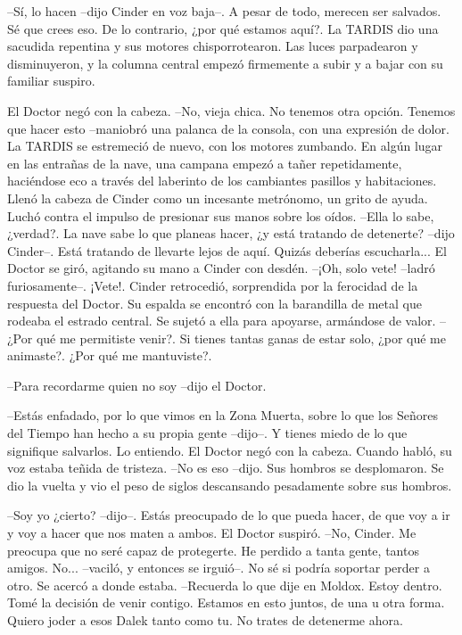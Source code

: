 --Sí, lo hacen --dijo Cinder en voz baja--. A pesar de todo, merecen ser salvados. Sé que crees eso. De lo contrario, ¿por qué estamos aquí?.
La TARDIS dio una sacudida repentina y sus motores chisporrotearon. Las luces parpadearon y disminuyeron, y la columna central empezó firmemente a subir y a bajar con su familiar suspiro.

El Doctor negó con la cabeza. 
--No, vieja chica. No tenemos otra opción. Tenemos que hacer esto --maniobró una palanca de la consola, con una expresión de dolor.
La TARDIS se estremeció de nuevo, con los motores zumbando. En algún lugar en las entrañas de la nave, una campana empezó a tañer repetidamente, haciéndose eco a través del laberinto de los cambiantes pasillos y habitaciones. Llenó la cabeza de Cinder como un incesante metrónomo, un grito de ayuda. Luchó contra el impulso de presionar sus manos sobre los oídos.
--Ella lo sabe, ¿verdad?. La nave sabe lo que planeas hacer, ¿y está tratando de detenerte? --dijo Cinder--. Está tratando de llevarte lejos de aquí. Quizás deberías escucharla...
El Doctor se giró, agitando su mano a Cinder con desdén. 
--¡Oh, solo vete! --ladró furiosamente--. ¡Vete!.
Cinder retrocedió, sorprendida por la ferocidad de la respuesta del Doctor. Su espalda se encontró con la barandilla de metal que rodeaba el estrado central. Se sujetó a ella para apoyarse, armándose de valor. 
--¿Por qué me permitiste venir?. Si tienes tantas ganas de estar solo, ¿por qué me animaste?. ¿Por qué me mantuviste?.

--Para recordarme quien no soy --dijo el Doctor.

--Estás enfadado, por lo que vimos en la Zona Muerta, sobre lo que los Señores del Tiempo han hecho a su propia gente --dijo--. Y tienes miedo de lo que signifique salvarlos. Lo entiendo.
El Doctor negó con la cabeza. Cuando habló, su voz estaba teñida de tristeza. 
--No es eso --dijo. Sus hombros se desplomaron. Se dio la vuelta y vio el peso de siglos descansando pesadamente sobre sus hombros.

--Soy yo ¿cierto? --dijo--. Estás preocupado de lo que pueda hacer, de que voy a ir y voy a hacer que nos maten a ambos.
El Doctor suspiró. 
--No, Cinder. Me preocupa que no seré capaz de protegerte. He perdido a tanta gente, tantos amigos. No... --vaciló, y entonces se irguió--. No sé si podría soportar perder a otro.
Se acercó a donde estaba. 
--Recuerda lo que dije en Moldox. Estoy dentro. Tomé la decisión de venir contigo. Estamos en esto juntos, de una u otra forma. Quiero joder a esos Dalek tanto como tu. No trates de detenerme ahora.

